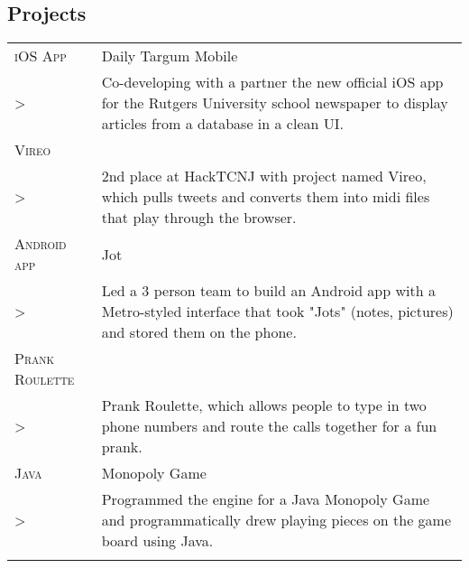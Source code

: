 \documentclass[a4paper, oneside, final]{scrartcl} %
\newcommand{\gray}{\rowcolor[gray]{.90}} %
\begin{document}
\begin{center}


\section{Projects}

\begin{tabularx}{0.97\linewidth}{>{\raggedleft\scshape}p{2.7cm}X}
    \gray iOS App & Daily Targum Mobile\\
  >& Co-developing with a partner the new official iOS app for the Rutgers University school newspaper to display articles from a database in a clean UI. \\
\gray Vireo & \\
  >& 2nd place at HackTCNJ with project named Vireo, which pulls tweets and converts them into midi files that play through the browser.\\
\gray Android app & Jot\\
  >& Led a 3 person team to build an Android app with a Metro-styled interface that took "Jots" (notes, pictures) and stored them on the phone. \\
\gray Prank Roulette & \\
  >& Prank Roulette, which allows people to type in two phone numbers and route the calls together for a fun prank. \\
\gray Java & Monopoly Game\\
  >& Programmed the engine for a Java Monopoly Game and programmatically drew playing pieces on the game board using Java. \\ \\
\end{tabularx}



\end{center}
\end{document}
